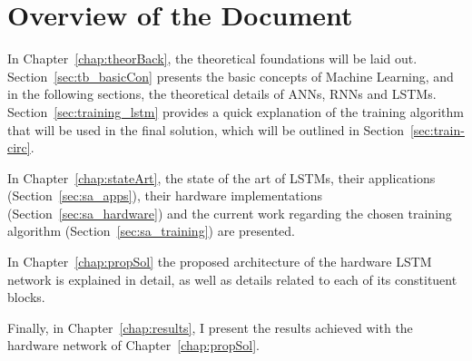 \section{Overview of the Document}\label{sec:intro_overview}
In Chapter~\ref{chap:theorBack}, the theoretical foundations will be laid out. Section~\ref{sec:tb_basicCon} presents the
basic concepts of Machine Learning, and in the following sections, the theoretical details of ANNs, RNNs and LSTMs.
Section~\ref{sec:training_lstm} provides a quick explanation of the training algorithm that will be used in the final
solution, which will be outlined in Section~\ref{sec:train-circ}.

In Chapter~\ref{chap:stateArt}, the state of the art of LSTMs, their applications (Section~\ref{sec:sa_apps}), their
hardware implementations (Section~\ref{sec:sa_hardware}) and the current work regarding the chosen training algorithm (Section~\ref{sec:sa_training})
are presented.

In Chapter~\ref{chap:propSol} the proposed architecture of the hardware LSTM network is explained in detail, as well as details
related to each of its constituent blocks.

Finally, in Chapter~\ref{chap:results}, I present the results achieved with the hardware network of Chapter~\ref{chap:propSol}.
